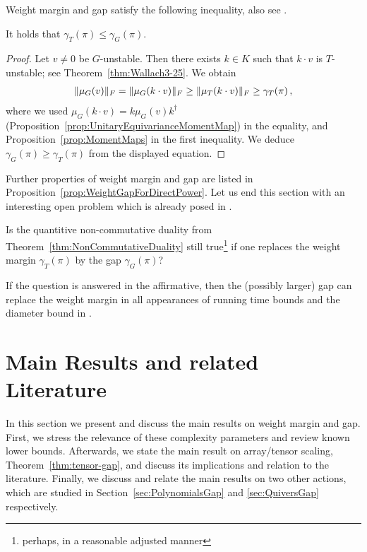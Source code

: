 Weight margin and gap satisfy the following inequality, also see \cite[Lemma~3.19]{GradflowArXiv}.

\begin{prop} \label{prop:GapConstantWeightMargin}
	It holds that $\gamma_{T}(\pi) \leq \gamma_G(\pi)$.
\end{prop}

\begin{proof}
	Let $v \neq 0$ be $G$-unstable. Then there exists $k \in K$ such that $k \cdot v$ is $T$-unstable; see Theorem~\ref{thm:Wallach3-25}. %
	We obtain
	\begin{align*}
		\lVert\mu_G(v)\rVert_F = \lVert\mu_G( k \cdot v)\rVert_F \geq \lVert\mu_{T}( k \cdot v)\rVert_F \geq \gamma_{T}(\pi) \, ,
	\end{align*}
	where we used $\mu_G(k \cdot v) = k \mu_G(v) k^\dagger$ (Proposition~\ref{prop:UnitaryEquivarianceMomentMap}) in the equality, and Proposition~\ref{prop:MomentMaps} in the first inequality. We deduce $\gamma_G(\pi) \geq \gamma_{T}(\pi)$ from the displayed equation.
\end{proof}

Further properties of weight margin and gap are listed in Proposition~\ref{prop:WeightGapForDirectPower}. Let us end this section with an interesting open problem which is already posed in \cite[Remark~3.20]{GradflowArXiv}.

\begin{problem}\label{prob:GapInNoncommutativeDuality}
	Is the quantitive non-commutative duality from Theorem~\ref{thm:NonCommutativeDuality}
	still true\footnote{perhaps, in a reasonable adjusted manner} if one replaces the weight margin $\gamma_T(\pi)$ by the gap $\gamma_{G}(\pi)$?
\end{problem}

If the question is answered in the affirmative, then the (possibly larger) gap can replace the weight margin in all appearances of running time bounds and the diameter bound in \cite{GradflowArXiv}.




\section{Main Results and related Literature}\label{sec:GapMainResults}


In this section we present and discuss the main results on weight margin and gap. First, we stress the relevance of these complexity parameters and review known lower bounds. Afterwards, we state the main result on array/tensor scaling, Theorem~\ref{thm:tensor-gap}, and discuss its implications and relation to the literature. Finally, we discuss and relate the main results on two other actions, which are studied in Section~\ref{sec:PolynomialsGap} and \ref{sec:QuiversGap} respectively.


